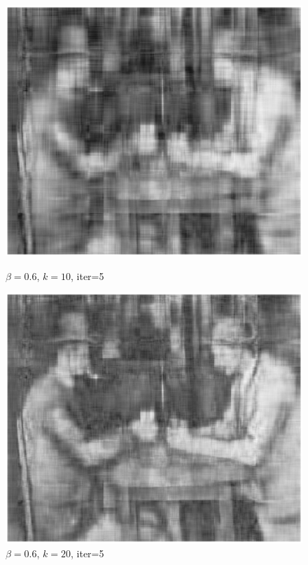 \documentclass[11pt,onecolumn]{article}
\begin{document}
\begin{figure}[H]
  \centering
  \begin{minipage}{0.3\textwidth}
    \centering
    \includegraphics[width=1\textwidth]{./images/204.png}
    \caption{$\beta=0.6$, $k=10$, iter=5}
  \end{minipage}\hfill
  \begin{minipage}{0.3\textwidth}
    \centering
    \includegraphics[width=1\textwidth]{./images/205.png}
    \caption{$\beta=0.6$, $k=20$, iter=5}
  \end{minipage}\hfill

\end{figure}
\end{document}

